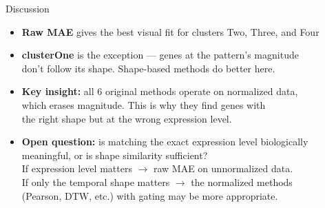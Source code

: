 \documentclass[aspectratio=169,12pt,handout]{beamer}
\begin{document}
\begin{frame}{Discussion}
\begin{itemize}\itemsep8pt
  \item \textbf{Raw MAE} gives the best visual fit for clusters Two, Three, and Four
  \item \textbf{clusterOne} is the exception --- genes at the pattern's magnitude\\
        don't follow its shape. Shape-based methods do better here.
  \item \textbf{Key insight:} all 6 original methods operate on normalized data,\\
        which erases magnitude. This is why they find genes with\\
        the right shape but at the wrong expression level.
  \item \textbf{Open question:} is matching the exact expression level biologically\\
        meaningful, or is shape similarity sufficient?\\
        If expression level matters $\rightarrow$ raw MAE on unnormalized data.\\
        If only the temporal shape matters $\rightarrow$ the normalized methods\\
        (Pearson, DTW, etc.) with gating may be more appropriate.
\end{itemize}
\end{frame}
\end{document}
